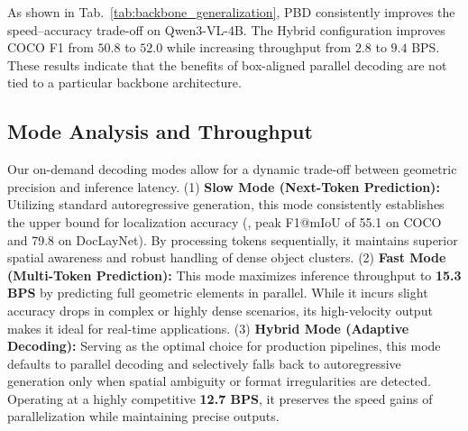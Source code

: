 \begin{table}
    \vspace{-5mm}
    \captionsetup{
        width=\linewidth,
        justification=raggedright,
        singlelinecheck=false
    }
    \setlength{\abovecaptionskip}{0pt}
    \setlength{\belowcaptionskip}{2pt}
    \caption{\textbf{Backbone generalization.}}
    \label{tab:backbone_generalization}
    \small
    \renewcommand{\arraystretch}{0.88}
    \setlength{\tabcolsep}{3.2pt}
    \vspace{-5mm}
\end{table}

As shown in Tab.~\ref{tab:backbone_generalization}, PBD consistently improves the speed--accuracy trade-off on Qwen3-VL-4B. The Hybrid configuration improves COCO F1 from $50.8$ to $52.0$ while increasing throughput from $2.8$ to $9.4$ BPS. These results indicate that the benefits of box-aligned parallel decoding are not tied to a particular backbone architecture.

\subsection{Mode Analysis and Throughput}
Our on-demand decoding modes allow for a dynamic trade-off between geometric precision and inference latency. (1) \textbf{Slow Mode (Next-Token Prediction):} Utilizing standard autoregressive generation, this mode consistently establishes the upper bound for localization accuracy (\eg, peak F1@mIoU of 55.1 on COCO and 79.8 on DocLayNet). By processing tokens sequentially, it maintains superior spatial awareness and robust handling of dense object clusters. (2) \textbf{Fast Mode (Multi-Token Prediction):} This mode maximizes inference throughput to \textbf{15.3 BPS} by predicting full geometric elements in parallel. While it incurs slight accuracy drops in complex or highly dense scenarios, its high-velocity output makes it ideal for real-time applications. (3) \textbf{Hybrid Mode (Adaptive Decoding):} Serving as the optimal choice for production pipelines, this mode defaults to parallel decoding and selectively falls back to autoregressive generation only when spatial ambiguity or format irregularities are detected. Operating at a highly competitive \textbf{12.7 BPS}, it preserves the speed gains of parallelization while maintaining precise outputs.

